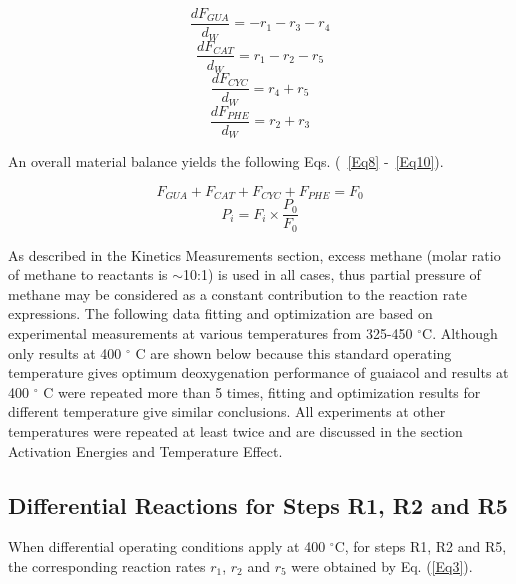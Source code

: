 \documentclass[journal=iecred,manuscript=article]{achemso}
\begin{document}
\begin{equation} \label{Eq4}
\frac{dF_{GUA}}{d_{W}}=-r_1-r_3-r_4
\end{equation}
\begin{equation} \label{Eq5}
\frac{dF_{CAT}}{d_{W}}=r_1-r_2-r_5
\end{equation}
\begin{equation} \label{Eq6}
\frac{dF_{CYC}}{d_{W}}=r_4+r_5
\end{equation}
\begin{equation} \label{Eq7}
\frac{dF_{PHE}}{d_{W}}=r_2+r_3
\end{equation}

An overall material balance yields the following Eqs. (~\ref{Eq8} -~\ref{Eq10}).

\begin{equation} \label{Eq8}
F_{GUA}+F_{CAT}+F_{CYC}+F_{PHE}=F_{0}
\end{equation}
\begin{equation} \label{Eq10}
P_{i}=F_{i} \times \frac{P_{0}}{F_{0}}
\end{equation}

As described in the Kinetics Measurements section,
excess methane (molar ratio of methane to reactants is $\sim$10:1)
is used in all cases,
thus partial pressure of methane may be considered as a constant contribution to the reaction rate expressions.
The following data fitting and optimization are based on experimental measurements at various temperatures from 325-450 $^{\circ}$C.
Although only results at 400 $^{\circ}$ C are shown below because this standard operating temperature
gives optimum deoxygenation performance of guaiacol \cite{Xiao2015}
and results at 400 $^{\circ}$ C were repeated more than 5 times,
fitting and optimization results for different temperature give similar conclusions.
All experiments at other temperatures were repeated at least twice and are discussed in the section Activation Energies and Temperature Effect.

\subsection{Differential Reactions for Steps R1, R2 and R5}
When differential operating conditions apply at 400 $^{\circ}$C, for steps R1, R2 and R5,
the corresponding reaction rates $r_1$, $r_2$ and $r_5$ were obtained by Eq. (\ref{Eq3}).
\end{document}
